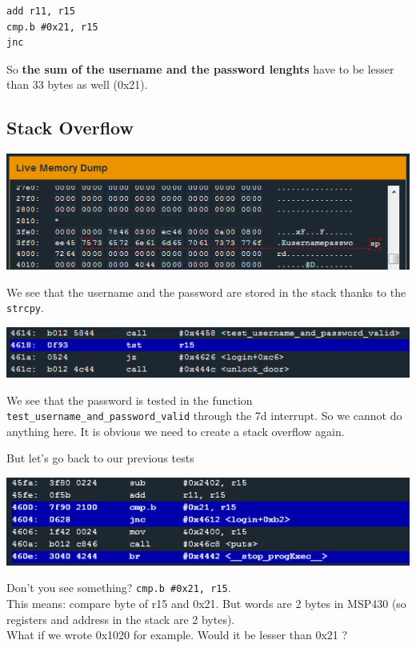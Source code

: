 \begin{verbatim}
add r11, r15
cmp.b #0x21, r15
jnc
\end{verbatim}

So \textbf{the sum of the username and the password lenghts} have to be
lesser than 33 bytes as well (0x21).

\subsection{Stack Overflow}\label{stack-overflow-1}

\includegraphics{img/11_3.PNG}

We see that the username and the password are stored in the stack thanks
to the \texttt{strcpy}.

\includegraphics{img/11_4.PNG}

We see that the password is tested in the function
\texttt{test\_username\_and\_password\_valid} through the 7d interrupt.
So we cannot do anything here. It is obvious we need to create a stack
overflow again.

But let's go back to our previous tests

\includegraphics{img/11_2.PNG}

Don't you see something? \texttt{cmp.b \#0x21, r15}.\\This means:
compare byte of r15 and 0x21. But words are 2 bytes in MSP430 (so
registers and address in the stack are 2 bytes).\\What if we wrote
0x1020 for example. Would it be lesser than 0x21 ?

